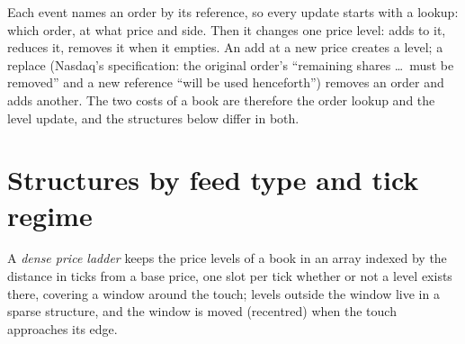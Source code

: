 Each event names an order by its reference, so every update starts with a lookup: which order, at what price and side.
Then it changes one price level: adds to it, reduces it, removes it when it empties. An add at a new price creates a level;
a replace (Nasdaq's specification: the original order's ``remaining shares \dots\ must be removed'' and a new reference
``will be used henceforth'') removes an order and adds another. The two costs of a book are therefore the order lookup and
the level update, and the structures below differ in both.

\section{Structures by feed type and tick regime}

\begin{definition}\label{def:ll:the-order-book-builder:ladder}
A \emph{dense price ladder} keeps the price levels of a book in an array indexed by the distance in ticks from a base
price, one slot per tick whether or not a level exists there, covering a window around the touch; levels outside the window
live in a sparse structure, and the window is moved (recentred) when the touch approaches its edge.
\end{definition}

